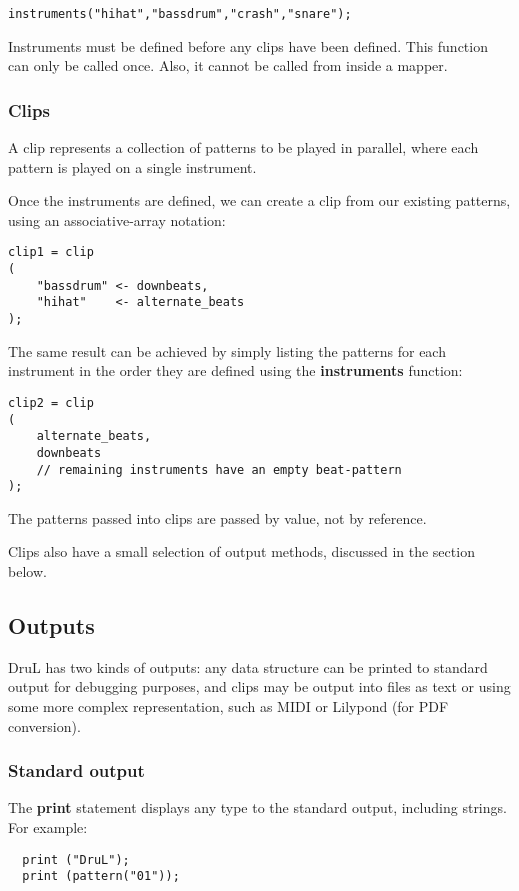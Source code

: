 \begin{verbatim}
instruments("hihat","bassdrum","crash","snare");
\end{verbatim}

Instruments must be defined before any clips have been defined. This function 
can only be called once. Also, it cannot be called from inside a mapper.

\subsubsection{Clips}

A clip represents a collection of patterns to be played in parallel, where each pattern is played on a single instrument.

Once the instruments are defined, we can create a clip from our existing patterns, using an
associative-array notation:

\begin{verbatim}
clip1 = clip
(
    "bassdrum" <- downbeats,
    "hihat"    <- alternate_beats
);
\end{verbatim}
The same result can be achieved by simply listing the patterns for each instrument in the order they are defined using the \textbf{instruments} function:
\begin{verbatim}
clip2 = clip
(
    alternate_beats,
    downbeats
    // remaining instruments have an empty beat-pattern
);

\end{verbatim}
The patterns passed into clips are passed by value, not by reference.


Clips also have a small selection of output methods, discussed in the section below.


\subsection{Outputs}

DruL has two kinds of outputs: any data structure can be printed to standard output for debugging purposes, and clips may be output into files as text or using some
more complex representation, such as MIDI or Lilypond (for PDF conversion).

\subsubsection{Standard output}

The \textbf{print} statement displays any type to the standard
output, including strings. For example:
\begin{verbatim}
  print ("DruL");
  print (pattern("01"));
\end{verbatim}

